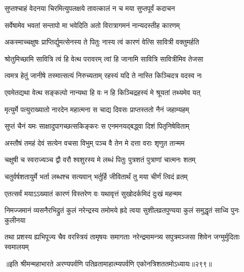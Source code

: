 \begin{center}
\twolineshloka
{सुप्तश्चाहं वेदनया चिरमित्युपलक्षये}
{तावत्कालं न च मया सुप्तपूर्वं कदाचन}


\twolineshloka
{सर्वेषामेव भवतां सन्तापो मा भवेदिति}
{अतो विरात्रागमनं नान्यदस्तीह कारणम्}




\twolineshloka
{अकस्माच्चक्षुषः प्राप्तिर्द्युमत्सेनस्य ते पितुः}
{नास्य त्वं कारणं वेत्सि सावित्री वक्तुमर्हति}


\twolineshloka
{श्रोतुमिच्छामि सावित्रि त्वं हि वेत्थ परावरम्}
{त्वां हि जानामि सावित्रि सावित्रीमिव तेजसा}


\twolineshloka
{त्वमत्र हेतुं जानीषे तस्मात्सत्यं निरुच्यताम्}
{रहस्यं यदि ते नास्ति किञ्चिदत्र वदस्व नः}




\twolineshloka
{एवमेतद्यथा वेत्थ सङ्कल्पो नान्यथा हि वः}
{न हि किञ्चिद्रहस्यं मे श्रूयतां तथ्यमेव यत्}


\twolineshloka
{मृत्युर्मे पत्युराख्यातो नारदेन महात्मना}
{स चाद्य दिवसः प्राप्तस्ततो नैनं जहाम्यहम्}


\twolineshloka
{सुप्तं चैनं यमः साक्षादुपागच्छत्सकिङ्करः}
{स एनमनयद्बद्ध्वा दिशं पितृनिषेविताम्}


\twolineshloka
{अस्तौषं तमहं देवं सत्येन वचसा विभुम्}
{पञ्च वै तेन मे दत्ता वराः शृणुत तान्मम}


\twolineshloka
{चक्षुषी च स्वराज्यञ्च द्वौ वरौ श्वशुरस्य मे}
{लब्धं पितुः पुत्रशतं पुत्राणां चात्मनः शतम्}


\twolineshloka
{चतुर्वर्षशतायुर्मे भर्ता लब्धश्च सत्यवान्}
{भर्तुर्हि जीवितार्थं तु मया चीर्णं त्विदं व्रतम्}



\twolineshloka
{एतत्सर्वं मयाऽऽख्यातं कारणं विस्तरेण वः}
{यथावृत्तं सुखोदर्कमिदं दुःखं महन्मम}




\fourlineindentedshloka
{निमज्जमानं व्यसनैरभिद्रुतं}
{कुलं नरेन्द्रस्य तमोमये ह्रदे}
{त्वया सुशीलव्रतपुण्यया कुलं}
{समुद्धृतं साध्वि पुनः कुलीनया}




\fourlineindentedshloka
{तथा प्रशस्य ह्यभिपूज्य चैव}
{वरस्त्रियं तामृषयः समागताः}
{नरेन्द्रमामन्त्र्य सपुत्रमञ्जसा}
{शिवेन जग्मुर्मुदिताः स्वमालयम्}


॥इति श्रीमन्महाभारते अरण्यपर्वणि
पतिव्रतामाहात्म्यपर्वणि एकोनत्रिशततमोऽध्यायः॥२९९॥



\end{center}

